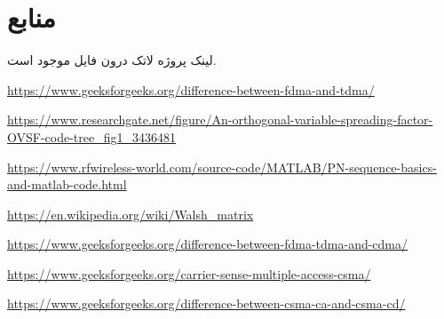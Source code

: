 \section{منابع}

لینک پروژه لاتک درون فایل
موجود است.

\vspace{2cm}
\small

\begin{latin}
    \url{https://www.geeksforgeeks.org/difference-between-fdma-and-tdma/}
    \newline
    
    \url{https://www.researchgate.net/figure/An-orthogonal-variable-spreading-factor-OVSF-code-tree_fig1_3436481}
    \newline
    
    \url{https://www.rfwireless-world.com/source-code/MATLAB/PN-sequence-basics-and-matlab-code.html}
    \newline
    
    \url{https://en.wikipedia.org/wiki/Walsh_matrix}
    \newline
    
    \url{https://www.geeksforgeeks.org/difference-between-fdma-tdma-and-cdma/}
    \newline
    
    \url{https://www.geeksforgeeks.org/carrier-sense-multiple-access-csma/}
    \newline
    
    \url{https://www.geeksforgeeks.org/difference-between-csma-ca-and-csma-cd/}
\end{latin}




